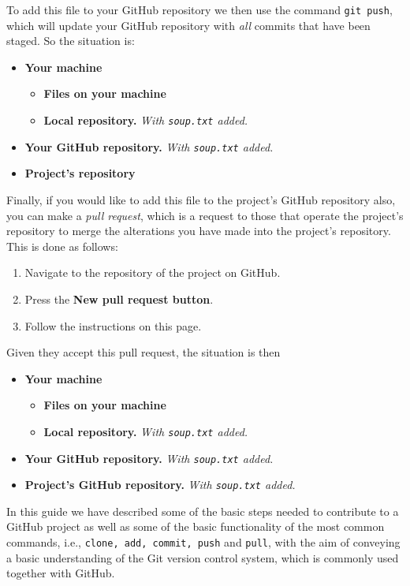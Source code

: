 \documentclass[11pt]{amsart}
\def\code#1{\texttt{#1}}
\begin{document}
To add this file to your GitHub repository we then use the command \code{git push}, which will update your GitHub repository with \emph{all} commits that have been staged. So the situation is:
\begin{itemize}
    \item \textbf{Your machine}
    \begin{itemize}
        \item \textbf{Files on your machine}
        \item \textbf{Local repository.} \emph{With \code{soup.txt} added.}
    \end{itemize}
    \item \textbf{Your GitHub repository.} \emph{With \code{soup.txt} added.}
    \item \textbf{Project's repository}
\end{itemize}
    
Finally, if you would like to add this file to the project's GitHub repository also, you can make a \emph{pull request}, which is a request  to those that operate the project's repository to merge the alterations you have made into the project's repository. This is done as follows: 
\begin{enumerate}
    \item Navigate to the repository of the project on GitHub. 
    \item Press the \textbf{New pull request button}.
    \item Follow the instructions on this page.
\end{enumerate}

Given they accept this pull request, the situation is then
\begin{itemize}
    \item \textbf{Your machine}
    \begin{itemize}
        \item \textbf{Files on your machine}
        \item \textbf{Local repository.} \emph{With \code{soup.txt} added.}
    \end{itemize}
    \item \textbf{Your GitHub repository.} \emph{With \code{soup.txt} added.}
    \item \textbf{Project's GitHub repository.} \emph{With \code{soup.txt} added.}
\end{itemize}

In this guide we have described some of the basic steps needed to contribute to a GitHub project as well as some of the basic functionality of the most common commands, i.e., \code{clone, add, commit, push} and \code{pull}, with the aim of conveying a basic understanding of the Git version control system, which is commonly used together with GitHub. 
\end{document}
